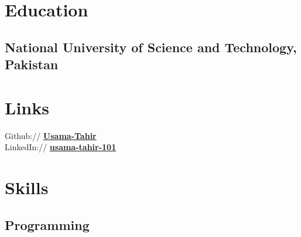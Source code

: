 \documentclass[draft=false]{deedy-resume-openfont}
\begin{document}
\begin{minipage}[t]{0.39\textwidth} 

\vspace{0.5cm}
\section{Education}
\vspace{0.1cm}
\subsection{National University of Science and Technology, Pakistan}
\vspace{0.1cm}
\vspace{0.1cm}

\vspace{0.5cm}
\section{Links}
\vspace{0.1cm}
Github:// \href{https://github.com/Usama-Tahir}{\bf Usama-Tahir}\\
LinkedIn://  \href{https://www.linkedin.com/in/usama-tahir-101/}{\bf usama-tahir-101}

\vspace{0.5cm}
\section{Skills}
\subsection{Programming}


\end{minipage}
\end{document}
